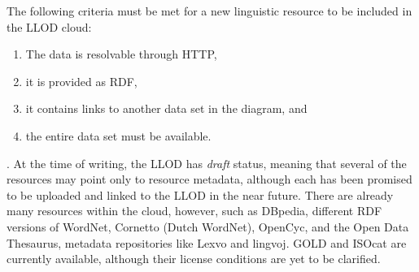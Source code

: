 The following criteria must be met for a new linguistic resource to be included in the LLOD cloud: \begin{enumerate}\item The data is resolvable through HTTP, \item it is provided as RDF, \item it contains links to another data set in the diagram, and \item the entire data set must be available.\end{enumerate}. At the time of writing, the LLOD has {\it draft} status, meaning that several of the resources may point only to resource metadata, although each has been promised to be uploaded and linked to the LLOD in the near future. There are already many resources within the cloud, however, such as DBpedia, different RDF versions of WordNet, Cornetto (Dutch WordNet), OpenCyc, and the Open Data Thesaurus, metadata repositories like Lexvo and lingvoj. GOLD and ISOcat are currently available, although their license conditions are yet to be clarified. 


